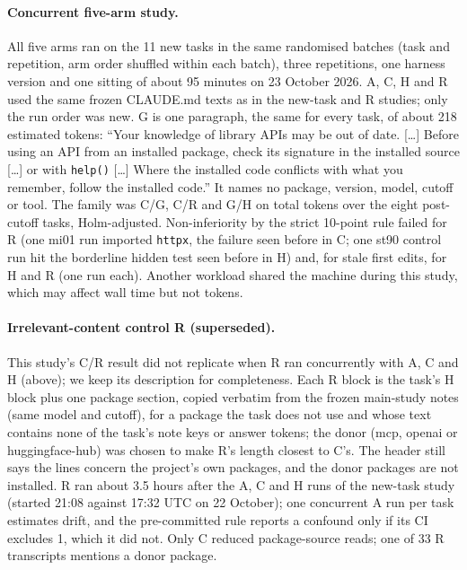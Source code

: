 \documentclass[11pt]{article}
\newcommand{\code}[1]{\texttt{#1}}
\begin{document}
\paragraph{Concurrent five-arm study.}
All five arms ran on the 11 new tasks in the same randomised batches (task and repetition, arm order shuffled within each batch), three repetitions, one harness version and one sitting of about 95 minutes on 23 October 2026. A, C, H and R used the same frozen CLAUDE.md texts as in the new-task and R studies; only the run order was new. G is one paragraph, the same for every task, of about 218 estimated tokens: ``Your knowledge of library APIs may be out of date. [\ldots] Before using an API from an installed package, check its signature in the installed source [\ldots] or with \code{help()} [\ldots] Where the installed code conflicts with what you remember, follow the installed code.'' It names no package, version, model, cutoff or tool. The family was C/G, C/R and G/H on total tokens over the eight post-cutoff tasks, Holm-adjusted. Non-inferiority by the strict 10-point rule failed for R (one mi01 run imported \code{httpx}, the failure seen before in C; one st90 control run hit the borderline hidden test seen before in H) and, for stale first edits, for H and R (one run each). Another workload shared the machine during this study, which may affect wall time but not tokens.

\paragraph{Irrelevant-content control R (superseded).}
This study's C/R result did not replicate when R ran concurrently with A, C and H (above); we keep its description for completeness.
Each R block is the task's H block plus one package section, copied verbatim from the frozen main-study notes (same model and cutoff), for a package the task does not use and whose text contains none of the task's note keys or answer tokens; the donor (mcp, openai or huggingface-hub) was chosen to make R's length closest to C's.
The header still says the lines concern the project's own packages, and the donor packages are not installed.
R ran about 3.5 hours after the A, C and H runs of the new-task study (started 21:08 against 17:32 UTC on 22 October); one concurrent A run per task estimates drift, and the pre-committed rule reports a confound only if its CI excludes 1, which it did not.
Only C reduced package-source reads; one of 33 R transcripts mentions a donor package.
\end{document}
